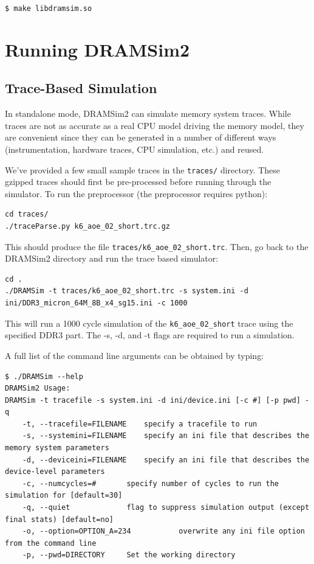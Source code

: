 \documentclass[11pt]{article}
\begin{document}
	\texttt{\$ make libdramsim.so }

\section{Running DRAMSim2}
\begin{minipage}{\textwidth}
\subsection{Trace-Based Simulation}

In standalone mode, DRAMSim2 can simulate memory system traces. While traces are not as accurate
as a real CPU model driving the memory model, they are convenient since they can be generated in a number of different
ways (instrumentation, hardware traces, CPU simulation, etc.) and reused. 

We've provided a few small sample traces in the \texttt{traces/} directory. These gzipped
traces should first be pre-processed before running through the simulator. 
To run the preprocessor (the preprocessor requires python): 
\begin{lstlisting}
cd traces/
./traceParse.py k6_aoe_02_short.trc.gz
\end{lstlisting}
	This should produce the file \texttt{traces/k6\_aoe\_02\_short.trc}. Then, go back to the DRAMSim2 directory and run the trace based simulator:

\begin{lstlisting}
cd .
./DRAMSim -t traces/k6_aoe_02_short.trc -s system.ini -d ini/DDR3_micron_64M_8B_x4_sg15.ini -c 1000
\end{lstlisting}
	This will run a 1000 cycle simulation of the \texttt{k6\_aoe\_02\_short} trace using 
	the specified DDR3 part. The -s, -d, and -t flags are required to run a simulation.

	A full list of the command line arguments can be obtained by typing:
\begin{lstlisting}
$ ./DRAMSim --help
DRAMSim2 Usage: 
DRAMSim -t tracefile -s system.ini -d ini/device.ini [-c #] [-p pwd] -q
	-t, --tracefile=FILENAME 	specify a tracefile to run  
	-s, --systemini=FILENAME 	specify an ini file that describes the memory system parameters  
	-d, --deviceini=FILENAME 	specify an ini file that describes the device-level parameters
	-c, --numcycles=# 		specify number of cycles to run the simulation for [default=30] 
	-q, --quiet 			flag to suppress simulation output (except final stats) [default=no]
	-o, --option=OPTION_A=234			overwrite any ini file option from the command line
	-p, --pwd=DIRECTORY		Set the working directory


\end{lstlisting}
\end{minipage}
\end{document}
